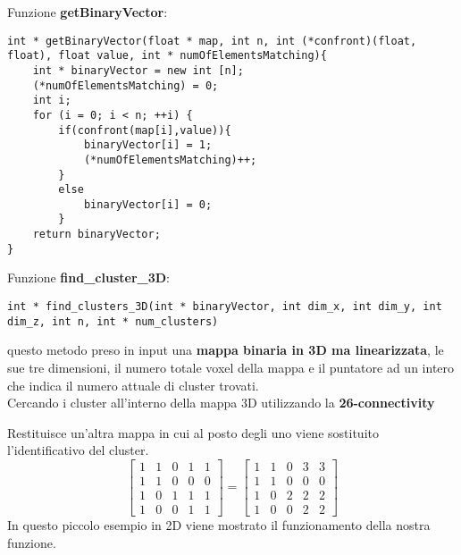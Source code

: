 \documentclass{beamer}
\begin{document}
\begin{frame}[fragile]
Funzione \textbf{getBinaryVector}:
\begin{center}
\begin{lstlisting}
int * getBinaryVector(float * map, int n, int (*confront)(float, float), float value, int * numOfElementsMatching){
    int * binaryVector = new int [n];
    (*numOfElementsMatching) = 0;
    int i;
    for (i = 0; i < n; ++i) {
        if(confront(map[i],value)){
            binaryVector[i] = 1;
            (*numOfElementsMatching)++;
        }
        else
            binaryVector[i] = 0;
        }
    return binaryVector;
}
\end{lstlisting}
\end{center}
\end{frame}

\begin{frame}[fragile]
Funzione \textbf{find\_cluster\_3D}:\\
\begin{lstlisting}
int * find_clusters_3D(int * binaryVector, int dim_x, int dim_y, int dim_z, int n, int * num_clusters)
\end{lstlisting}
questo metodo preso in input una \textbf{mappa binaria in 3D ma linearizzata}, le sue tre dimensioni, il numero totale voxel della mappa e il puntatore ad un intero che indica il numero attuale di cluster trovati.\\
\smallskip
Cercando i cluster all'interno della mappa 3D utilizzando la \textbf{26-connectivity}
\end{frame}

\begin{frame}
Restituisce un'altra mappa in cui al posto degli uno viene sostituito l'identificativo del cluster.
\[
\begin{bmatrix}
    1       & 1 & 0 & 1 & 1\\
    1       & 1 & 0 & 0 & 0 \\
    1       & 0 & 1 & 1 & 1 \\
    1       & 0 & 0 & 1 & 1
\end{bmatrix}
=
\begin{bmatrix}
    1       & 1 & 0 & 3 & 3\\
    1       & 1 & 0 & 0 & 0 \\
    1       & 0 & 2 & 2 & 2 \\
    1       & 0 & 0 & 2 & 2
\end{bmatrix}
\]
In questo piccolo esempio in 2D viene mostrato il funzionamento della nostra funzione.
\end{frame}
\end{document}
